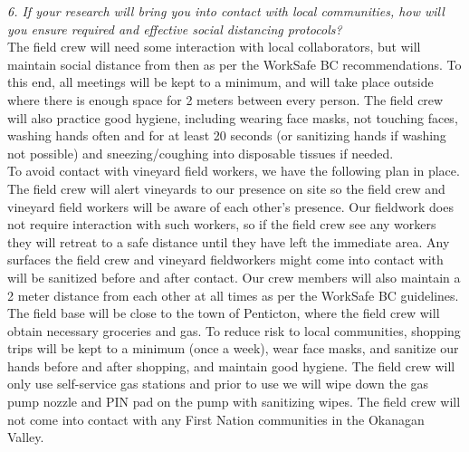\documentclass[11pt,letter]{article}
\begin{document}
\emph{6. If your research will bring you into contact with local communities, how will you ensure required and effective social distancing protocols?}\\

The field crew will need some interaction with local collaborators, but will maintain social distance from then as per the WorkSafe BC recommendations. To this end, all meetings will be kept to a minimum, and will take place outside where there is enough space for 2 meters between every person. The field crew will also practice good hygiene, including wearing face masks, not touching faces, washing hands often and for at least 20 seconds (or sanitizing hands if washing not possible) and sneezing/coughing into disposable tissues if needed. \\

To avoid contact with vineyard field workers, we have the following plan in place. The field crew will alert vineyards to our presence on site so the field crew and vineyard field workers will be aware of each other's presence. Our fieldwork does not require interaction with such workers, so if the field crew see any workers they will retreat to a safe distance until they have left the immediate area. Any surfaces the field crew and vineyard fieldworkers might come into contact with will be sanitized before and after contact. Our crew members will also maintain a 2 meter distance from each other at all times as per the WorkSafe BC guidelines. \\

The field base will be close to the town of Penticton, where the field crew will obtain necessary groceries and gas. To reduce risk to local communities, shopping trips will be kept to a minimum (once a week), wear face masks, and sanitize our hands before and after shopping, and maintain good hygiene. The field crew will only use self-service gas stations and prior to use we will wipe down the gas pump nozzle and PIN pad on the pump with sanitizing wipes. The field crew will not come into contact with any First Nation communities in the Okanagan Valley.\\ 
\end{document}
